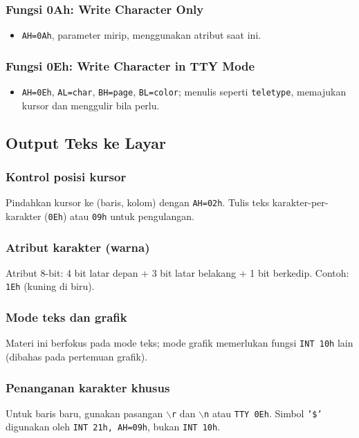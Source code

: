 \subsubsection{Fungsi 0Ah: Write Character Only}
\begin{itemize}
  \item \texttt{AH=0Ah}, parameter mirip, menggunakan atribut saat ini.
\end{itemize}
\subsubsection{Fungsi 0Eh: Write Character in TTY Mode}
\begin{itemize}
  \item \texttt{AH=0Eh}, \texttt{AL=char}, \texttt{BH=page}, \texttt{BL=color}; menulis seperti \texttt{teletype}, memajukan kursor dan menggulir bila perlu.
\end{itemize}

\subsection{Output Teks ke Layar}
\subsubsection{Kontrol posisi kursor}
Pindahkan kursor ke (baris, kolom) dengan \texttt{AH=02h}. Tulis teks karakter-per-karakter (\texttt{0Eh}) atau \texttt{09h} untuk pengulangan.

\subsubsection{Atribut karakter (warna)}
Atribut 8-bit: 4 bit latar depan + 3 bit latar belakang + 1 bit berkedip. Contoh: \texttt{1Eh} (kuning di biru).

\subsubsection{Mode teks dan grafik}
Materi ini berfokus pada mode teks; mode grafik memerlukan fungsi \texttt{INT 10h} lain (dibahas pada pertemuan grafik).

\subsubsection{Penanganan karakter khusus}
Untuk baris baru, gunakan pasangan \texttt{$\backslash$r} dan \texttt{$\backslash$n} atau \texttt{TTY 0Eh}. Simbol \texttt{'\$'} digunakan oleh \texttt{INT 21h, AH=09h}, bukan \texttt{INT 10h}.

